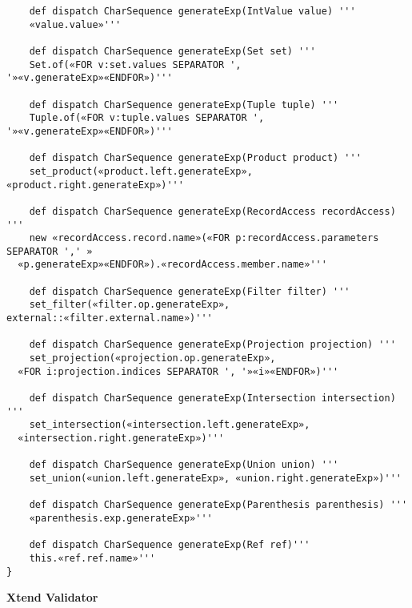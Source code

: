 \documentclass[12pt]{article}
\begin{document}
\begin{verbatim}
	def dispatch CharSequence generateExp(IntValue value) '''
	«value.value»'''
	
	def dispatch CharSequence generateExp(Set set) '''
	Set.of(«FOR v:set.values SEPARATOR ', '»«v.generateExp»«ENDFOR»)'''
	
	def dispatch CharSequence generateExp(Tuple tuple) '''
	Tuple.of(«FOR v:tuple.values SEPARATOR ', '»«v.generateExp»«ENDFOR»)'''
	
	def dispatch CharSequence generateExp(Product product) '''
	set_product(«product.left.generateExp», «product.right.generateExp»)'''
	
	def dispatch CharSequence generateExp(RecordAccess recordAccess) '''
	new «recordAccess.record.name»(«FOR p:recordAccess.parameters SEPARATOR ',' »
  «p.generateExp»«ENDFOR»).«recordAccess.member.name»'''
	
	def dispatch CharSequence generateExp(Filter filter) '''
	set_filter(«filter.op.generateExp», external::«filter.external.name»)'''
	
	def dispatch CharSequence generateExp(Projection projection) '''
	set_projection(«projection.op.generateExp», 
  «FOR i:projection.indices SEPARATOR ', '»«i»«ENDFOR»)'''
	
	def dispatch CharSequence generateExp(Intersection intersection) '''
	set_intersection(«intersection.left.generateExp», 
  «intersection.right.generateExp»)'''
	
	def dispatch CharSequence generateExp(Union union) '''
	set_union(«union.left.generateExp», «union.right.generateExp»)'''
	
	def dispatch CharSequence generateExp(Parenthesis parenthesis) '''
	«parenthesis.exp.generateExp»'''
	
	def dispatch CharSequence generateExp(Ref ref)'''
	this.«ref.ref.name»'''
}

\end{verbatim}

\textbf{Xtend Validator}
\end{document}
